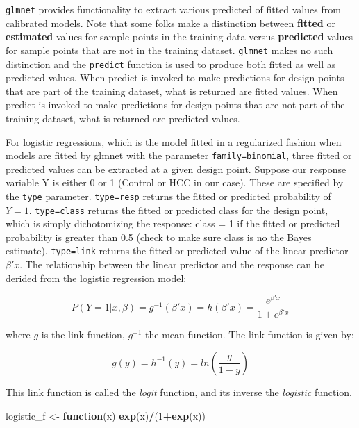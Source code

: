 \documentclass[
]{book}
\newenvironment{Shaded}{\begin{snugshade}}{\end{snugshade}}
\newcommand{\ControlFlowTok}[1]{\textcolor[rgb]{0.13,0.29,0.53}{\textbf{#1}}}
\newcommand{\DecValTok}[1]{\textcolor[rgb]{0.00,0.00,0.81}{#1}}
\newcommand{\KeywordTok}[1]{\textcolor[rgb]{0.13,0.29,0.53}{\textbf{#1}}}
\newcommand{\NormalTok}[1]{#1}
\newcommand{\OperatorTok}[1]{\textcolor[rgb]{0.81,0.36,0.00}{\textbf{#1}}}
\newcommand{\StringTok}[1]{\textcolor[rgb]{0.31,0.60,0.02}{#1}}
\begin{document}
\texttt{glmnet} provides functionality to extract various predicted of fitted values
from calibrated models. Note that some folks make a distinction between
\textbf{fitted} or \textbf{estimated} values for sample points in the training data
versus \textbf{predicted} values for sample points that
are not in the training dataset. \texttt{glmnet} makes no such distinction and the
\texttt{predict} function is used to produce both fitted as well as predicted values.
When predict is invoked to make predictions for design points that are part
of the training dataset, what is returned are fitted values.
When predict is invoked to make predictions for design points that are not part
of the training dataset, what is returned are predicted values.

For logistic regressions, which is the model fitted in a regularized fashion
when models are fitted by glmnet with the parameter \texttt{family=\textquotesingle{}binomial\textquotesingle{}}, three
fitted or predicted values can be extracted at a given design point.
Suppose our response variable Y is either 0 or 1 (Control or HCC in our case).
These are specified by the \texttt{type} parameter. \texttt{type=\textquotesingle{}resp\textquotesingle{}} returns
the fitted or predicted probability of \(Y=1\). \texttt{type=\textquotesingle{}class\textquotesingle{}} returns the fitted or
predicted class for the design point, which is simply dichotomizing the
response: class = 1 if the fitted or predicted probability is greater than 0.5
(check to make sure class is no the Bayes estimate). \texttt{type=\textquotesingle{}link\textquotesingle{}} returns
the fitted or predicted value of the linear predictor \(\beta'x\). The relationship
between the linear predictor and the response can be derided from the
logistic regression model:

\[P(Y=1|x,\beta) = g^{-1}(\beta'x) = h(\beta'x) = \frac{e^{\beta'x}}{1+e^{\beta'x}}\]

where \(g\) is the link function, \(g^{-1}\) the mean function.
The link function is given by:

\[g(y) = h^{-1}(y) = ln(\frac{y}{1-y})\]

This link function is called the \emph{logit} function, and its inverse the \emph{logistic}
function.

\begin{Shaded}
\begin{Highlighting}[]
\NormalTok{logistic\_f <{-}}\StringTok{ }\ControlFlowTok{function}\NormalTok{(x) }\KeywordTok{exp}\NormalTok{(x)}\OperatorTok{/}\NormalTok{(}\DecValTok{1}\OperatorTok{+}\KeywordTok{exp}\NormalTok{(x))}
\end{Highlighting}
\end{Shaded}
\end{document}
